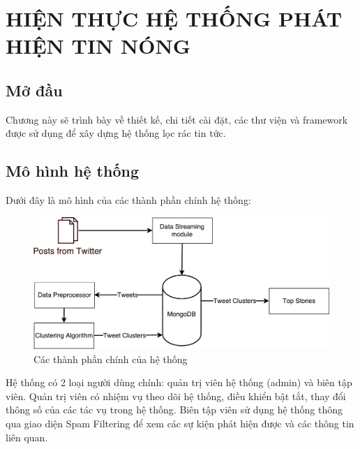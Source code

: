 \chapter{HIỆN THỰC HỆ THỐNG PHÁT HIỆN TIN NÓNG}
\ifpdf
    \graphicspath{{Chapter3/Chapter3Figs/PNG/}{Chapter3/Chapter3Figs/PDF/}{Chapter3/Chapter3Figs/}}
\else
    \graphicspath{{Chapter3/Chapter3Figs/EPS/}{Chapter3/Chapter3Figs/}}
\fi

\section{Mở đầu}
Chương này sẽ trình bày về thiết kế, chi tiết cài đặt, các thư viện và framework được sử dụng để xây dựng hệ thống lọc rác tin tức.

\section{Mô hình hệ thống}
Dưới đây là mô hình của các thành phần chính hệ thống:
\begin{figure}[H]
	\centering
	\includegraphics[width=0.9\linewidth]{Chapter3/Chapter3Figs/PDF/SystemArchitecture}
	\caption{Các thành phần chính của hệ thống}
	\label{fig:systemarchitecture}
\end{figure}

Hệ thống có 2 loại người dùng chính: quản trị viên hệ thống (admin) và biên tập viên. Quản trị viên có nhiệm vụ theo dõi hệ thống, điều khiển bật tắt, thay đổi thông số của các tác vụ trong hệ thống. Biên tập viên sử dụng hệ thống thông qua giao diện Spam Filtering để xem các sự kiện phát hiện được và các thông tin liên quan.

